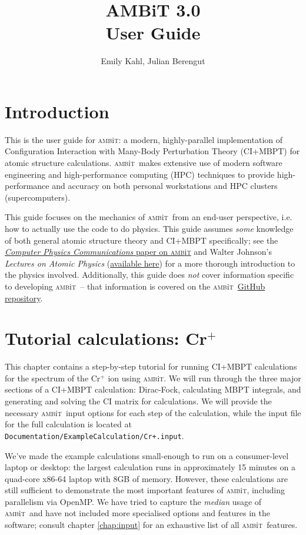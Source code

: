 \documentclass{report}
\newcommand{\ambit}{\textsc{amb}{\footnotesize i}\textsc{t}}
\begin{document}
\title{AMBiT 3.0\\User Guide}
\author{Emily Kahl, Julian Berengut}
\date{}
\maketitle

\tableofcontents

\chapter{Introduction}
This is the user guide for \ambit: a modern, highly-parallel implementation of Configuration Interaction
with Many-Body Perturbation Theory (CI+MBPT) for atomic structure calculations. \ambit\ makes extensive 
use of modern software engineering and high-performance computing (HPC) techniques to provide 
high-performance and accuracy on both personal workstations and HPC clusters (supercomputers).

This guide focuses on the mechanics of \ambit\ from an end-user perspective, i.e. how to actually use the
code to do physics. This guide assumes \emph{some} knowledge of both general atomic structure theory and
CI+MBPT specifically; see the \href{link_goes_here}{\textit{Computer Physics Communications} paper on 
\ambit} and Walter Johnson's \textit{Lectures on Atomic Physics} 
(\href{https://www3.nd.edu/~johnson/Publications/book.pdf}{available here}) for a more thorough 
introduction to the physics involved. Additionally, this guide does \emph{not} cover information 
specific to developing \ambit\ -- that information is covered on the \ambit\  
\href{https://github.com/drjuls/AMBiT}{GitHub repository}.

\chapter{Tutorial calculations: Cr$^+$}

This chapter contains a step-by-step tutorial for running CI+MBPT calculations for the spectrum of the
Cr$^+$ ion using \ambit. We will run through the three major sections of a CI+MBPT calculation:
Dirac-Fock, calculating MBPT integrals, and generating and solving the CI matrix for calculations. We
will provide the necessary \ambit\  input options for each step of the calculation, while the input file
for the full calculation is located at \texttt{Documentation/ExampleCalculation/Cr+.input}.

We've made the example calculations small-enough to run on a consumer-level laptop or desktop: the
largest calculation runs in approximately 15 minutes on a quad-core x86-64 laptop with 8GB of
memory. However, these calculations are still sufficient to demonstrate the most important features of 
\ambit, including parallelism via OpenMP. We have tried to capture the \textit{median} usage of \ambit\ 
and have not included more specialised options and features in the software; consult chapter
\ref{chap:input} for an exhaustive list of all \ambit\  features.
\end{document}
